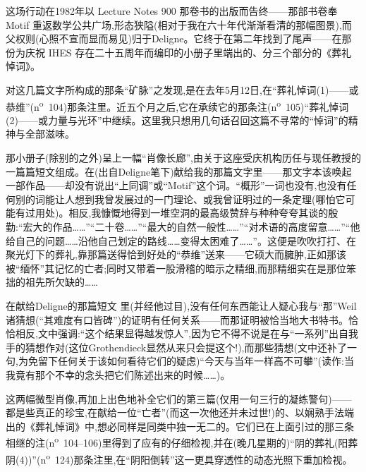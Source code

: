 这场行动在1982年以 Lecture Notes 900 那卷书的出版而告终——那部书卷奉 Motif 重返数学公共广场,形态狭隘(相对于我在六十年代渐渐看清的那幅图景),而父权则(心照不宣而显而易见)归于Deligne。它终于在第二年找到了尾声——在那份为庆祝 IHES 存在二十五周年而编印的小册子里端出的、分三个部分的《葬礼悼词》。

对这几篇文字所构成的那条“矿脉”之发现,是在去年5月12日,在“葬礼悼词(1)——或恭维”(n\textsuperscript{o}~104)那条注里。近五个月之后,它在承续它的那条注(n\textsuperscript{o}~105)“葬礼悼词(2)——或力量与光环”中继续。这里我只想用几句话召回这篇不寻常的“悼词”的精神与全部滋味。

那小册子(除别的之外)呈上一幅“肖像长廊”,由关于这座受庆机构历任与现任教授的一篇篇短文组成。在(出自Deligne笔下)献给我的那篇文字里——那文字本该唤起一部作品——却没有说出“上同调”或“Motif”这个词。“概形”一词也没有,也没有任何别的词能让人想到我曾发展过的一门理论、或我曾证明过的一条定理(哪怕它可能有过用处)。相反,我慷慨地得到一堆空洞的最高级赞辞与种种夸夸其谈的殷勤:“宏大的作品……”“二十卷……”“最大的自然一般性……”\dmark{}“对术语的高度留意……”“他给自己的问题……沿他自己划定的路线……变得太困难了……”。这便是吹吹打打、在聚光灯下的葬礼,靠那篇送得恰到好处的“恭维”送来——它硕大而臃肿,正如那该被“缅怀”其记忆的亡者;同时又带着一股滑稽的暗示之精细,而那精细实在是那位笨拙的祖先所欠缺的……

在献给Deligne的那篇短文 里(并经他过目),没有任何东西能让人疑心我与“那”Weil诸猜想(“其难度有口皆碑”)的证明有任何关系——而那证明被恰当地大书特书。恰恰相反,文中强调:“这个结果显得越发惊人”,因为它不得不说是在与“一系列”出自我手的猜想作对(这位Grothendieck显然从来只会提这个!),而那些猜想(文中还补了一句,为免留下任何关于该如何看待它们的疑虑)“今天与当年一样高不可攀”(读作:当我竟有那个不幸的念头把它们陈述出来的时候……)。

这两幅微型肖像,再加上出色地补全它们的第三篇(仅用一句三行的凝练警句)——都是些真正的珍宝,在献给一位“亡者”(而这一次他还并未过世!)的、以娴熟手法端出的《葬礼悼词》中,想必同样是同类中独一无二的。它们已在上面引过的那三条相继的注(n\textsuperscript{o}~104--106)里得到了应有的仔细检视,并在(晚几星期的)“阴的葬礼(阳葬阴(4))”(n\textsuperscript{o}~124)那条注里,在“阴阳倒转”这一更具穿透性的动态光照下重加检视。

